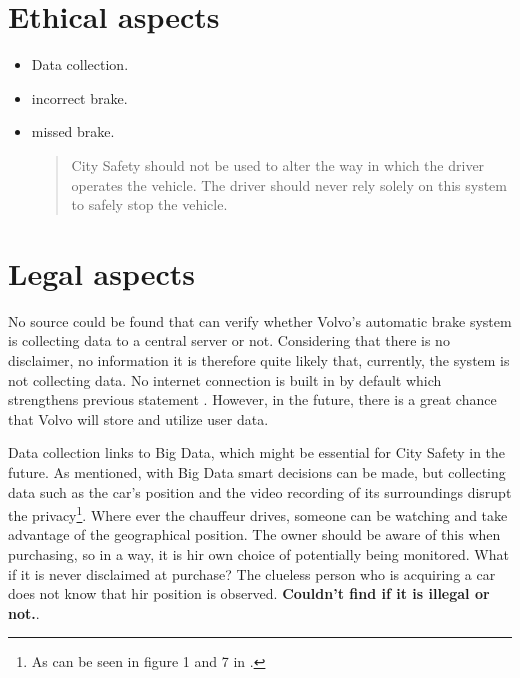 \documentclass[conference]{IEEEtran}
\begin{document}

\section{Ethical aspects}
\begin{itemize}
	\item Data collection.
	\item incorrect brake.
	\item missed brake.
	\begin{quotation}
		City Safety should not be used to alter the way in which the driver operates the vehicle. The driver should never rely solely on this system to safely stop the vehicle.
	\end{quotation}
\end{itemize}


\section{Legal aspects}
No source could be found that can verify whether Volvo's automatic brake system is collecting data to a central server or not. Considering that there is no disclaimer, no information it is therefore quite likely that, currently, the system is not collecting data. No internet connection is built in by default which strengthens previous statement \cite{SensusConnect}. However, in the future, there is a great chance that Volvo will store and utilize user data.

Data collection links to Big Data, which might be essential for City Safety in the future. As mentioned, with Big Data smart decisions can be made, but collecting data such as the car's position and the video recording of its surroundings disrupt the privacy\footnote{As can be seen in figure 1 and 7 in \cite{SysDescription}.}.  Where ever the chauffeur drives, someone can be watching and take advantage of the geographical position. The owner should be aware of this when purchasing, so in a way, it is hir own choice of potentially being monitored. What if it is never disclaimed at purchase? The clueless person who is acquiring a car does not know that hir position is observed. \textbf{Couldn't find if it is illegal or not.}.
\end{document}
